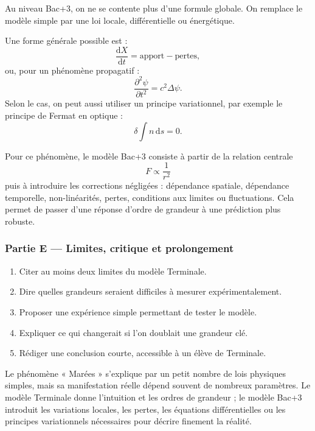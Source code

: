 \documentclass[11pt,a4paper]{article}
\begin{document}
\begin{approfondissementbox}
Au niveau Bac+3, on ne se contente plus d'une formule globale. On remplace le modèle simple par une loi locale, différentielle ou énergétique.

Une forme générale possible est :
\[
\frac{\mathrm d X}{\mathrm dt}=\text{apport}-\text{pertes},
\]
ou, pour un phénomène propagatif :
\[
\frac{\partial^2 \psi}{\partial t^2}=c^2\Delta\psi.
\]
Selon le cas, on peut aussi utiliser un principe variationnel, par exemple le principe de Fermat en optique :
\[
\delta \int n\,\mathrm ds=0.
\]

Pour ce phénomène, le modèle Bac+3 consiste à partir de la relation centrale
\[
F\propto\frac1{r^2}
\]
puis à introduire les corrections négligées : dépendance spatiale, dépendance temporelle, non-linéarités, pertes, conditions aux limites ou fluctuations. Cela permet de passer d'une réponse d'ordre de grandeur à une prédiction plus robuste.
\end{approfondissementbox}

\subsubsection*{Partie E — Limites, critique et prolongement}

\begin{enumerate}
  \item Citer au moins deux limites du modèle Terminale.
  \item Dire quelles grandeurs seraient difficiles à mesurer expérimentalement.
  \item Proposer une expérience simple permettant de tester le modèle.
  \item Expliquer ce qui changerait si l'on doublait une grandeur clé.
  \item Rédiger une conclusion courte, accessible à un élève de Terminale.
\end{enumerate}

\begin{corrigebox}
Le phénomène « Marées » s'explique par un petit nombre de lois physiques simples, mais sa manifestation réelle dépend souvent de nombreux paramètres. Le modèle Terminale donne l'intuition et les ordres de grandeur ; le modèle Bac+3 introduit les variations locales, les pertes, les équations différentielles ou les principes variationnels nécessaires pour décrire finement la réalité.
\end{corrigebox}
\end{document}
